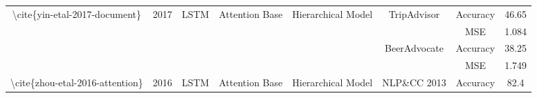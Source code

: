 \begin{table}[]
\begin{tabular}{|c|c|c|c|c|c|cc|}
    \multirow{4}{*}{\textbackslash{}cite\{yin-etal-2017-document\}}                       & \multirow{4}{*}{2017}                      & \multirow{4}{*}{LSTM}                             & \multirow{4}{*}{Attention Base}                           & \multirow{4}{*}{Hierarchical Model}                                                                                    & \multirow{2}{*}{TripAdvisor}                          & \multicolumn{1}{c|}{Accuracy}                                                                                                      & 46.65                      \\ \cline{7-8} 
                                                                                          &                                            &                                                   &                                                           &                                                                                                                        &                                                       & \multicolumn{1}{c|}{MSE}                                                                                                           & 1.084                      \\ \cline{6-8} 
                                                                                          &                                            &                                                   &                                                           &                                                                                                                        & \multirow{2}{*}{BeerAdvocate}                         & \multicolumn{1}{c|}{Accuracy}                                                                                                      & 38.25                      \\ \cline{7-8} 
                                                                                          &                                            &                                                   &                                                           &                                                                                                                        &                                                       & \multicolumn{1}{c|}{MSE}                                                                                                           & 1.749                      \\ \hline
    \textbackslash{}cite\{zhou-etal-2016-attention\}                                      & 2016                                       & LSTM                                              & Attention Base                                            & Hierarchical Model                                                                                                     & NLP\&CC 2013                                          & \multicolumn{1}{c|}{Accuracy}                                                                                                      & 82.4                       \\ \hline

\end{tabular}
\end{table}

